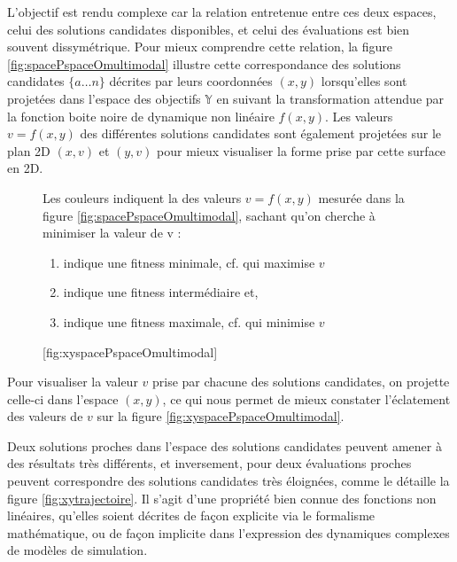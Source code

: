 L'objectif est rendu complexe car la relation entretenue entre ces deux espaces, celui des solutions candidates disponibles, et celui des évaluations est bien souvent dissymétrique. Pour mieux comprendre cette relation, la figure \ref{fig:spacePspaceOmultimodal} illustre cette correspondance des solutions candidates $\{a \dotsc n\}$ décrites par leurs coordonnées $(x,y)$ lorsqu'elles sont projetées dans l'espace des objectifs $\mathbb{Y}$ en suivant la transformation attendue par la fonction boite noire de dynamique non linéaire $f(x,y)$. Les valeurs $v = f(x,y)$ des différentes solutions candidates sont également projetées sur le plan 2D $(x,v)$ et $(y,v)$ pour mieux visualiser la forme prise par cette surface en 2D.

\begin{figure}[!htbp]
	\begin{sidecaption}[fortoc]{Les couleurs indiquent la  des valeurs $v = f(x,y)$ mesurée dans la figure \ref{fig:spacePspaceOmultimodal}, sachant qu'on cherche à minimiser la valeur de v :
\parbox{\marginparwidth}{
\begin{enumerate}[label={},labelindent=0pt,leftmargin=*]
        \item {} indique une fitness minimale, cf. qui maximise $v$
        \item {} indique une fitness intermédiaire et,
        \item {} indique une fitness maximale, cf. qui minimise $v$
\end{enumerate}}}[fig:xyspacePspaceOmultimodal]
	 \centering
	\end{sidecaption}
\end{figure}

Pour visualiser la valeur $v$ prise par chacune des solutions candidates, on projette celle-ci dans l'espace $(x,y)$, ce qui nous permet de mieux constater l'éclatement des valeurs de $v$ sur la figure \ref{fig:xyspacePspaceOmultimodal}.

Deux solutions proches dans l'espace des solutions candidates peuvent amener à des résultats très différents, et inversement, pour deux évaluations proches peuvent correspondre des solutions candidates très éloignées, comme le détaille la figure \ref{fig:xytrajectoire}. Il s'agit d'une propriété bien connue des fonctions non linéaires, qu'elles soient décrites de façon explicite via le formalisme mathématique, ou de façon implicite dans l'expression des dynamiques complexes de modèles de simulation.

